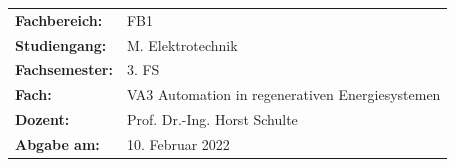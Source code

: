 \documentclass[
	pagesize,
	fontsize=12pt,
	paper=a4,
	oneside,
    reqno
]{scrartcl}
\numberwithin{equation}{section} %
\numberwithin{table}{section} %
\numberwithin{figure}{section} %
\begin{document}
\begin{titlepage}
   \vspace{1cm}

   \begin{tabular}{l l}
      \textbf{Fachbereich:}   & FB1                                                 \\
      \textbf{Studiengang:}   & M.\xspace Elektrotechnik                            \\
      \textbf{Fachsemester:}  & 3.\xspace FS                                        \\
      \textbf{Fach:}          & VA3 Automation in regenerativen Energiesystemen     \\
      \textbf{Dozent:}        & Prof.\xspace Dr.\xspace -Ing.\xspace Horst Schulte  \\
      \textbf{Abgabe am:}     & 10.\xspace Februar 2022                             \\ 
   \end{tabular}
\end{titlepage}
\clearpage

\renewcommand{\contentsname}{Inhaltsverzeichnis}
\tableofcontents
\clearpage

\renewcommand{\listfigurename}{Abbildungsverzeichnis}
\renewcommand*{\figurename}{Abb.}
\listoffigures

\renewcommand*{\listtablename}{Tabellenverzeichnis}
\renewcommand*{\tablename}{Tab.}
\listoftables

\end{document}
